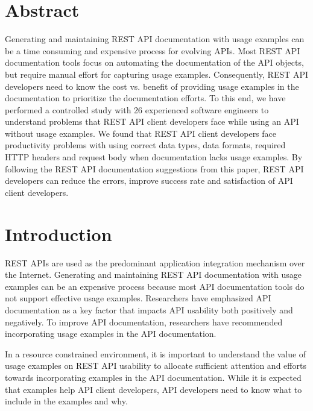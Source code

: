 \section{Abstract}
Generating and maintaining REST API documentation with usage examples can be a time consuming and expensive process for evolving APIs. Most REST API documentation tools focus on automating the documentation of the API objects, but require manual effort for capturing usage examples. Consequently, REST API developers need to know the cost vs. benefit of providing usage examples in the documentation to prioritize the documentation efforts. To this end, we have performed a controlled study with 26 experienced software engineers to understand problems that REST API client developers face while using an API without usage examples. We found that REST API client developers face productivity problems with using correct data types, data formats, required HTTP headers and request body when documentation lacks usage examples. By following the REST API documentation suggestions from this paper, REST API developers can reduce the errors, improve success rate and satisfaction of API client developers.







\section{Introduction}
REST APIs are used as the predominant application integration mechanism over the Internet. Generating and maintaining REST API documentation with usage examples can be an expensive process because most API documentation tools do not support effective usage examples. Researchers have emphasized API documentation as a key factor that impacts API usability both positively and negatively. To improve API documentation, researchers have recommended incorporating usage examples in the API documentation.

In a resource constrained environment, it is important to understand the value of usage examples on REST API usability to allocate sufficient attention and efforts towards incorporating examples in the API documentation. While it is expected that examples help API client developers, API developers need to know what to include in the examples and why.

